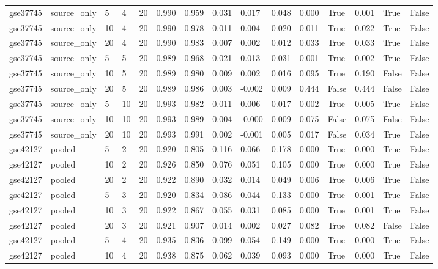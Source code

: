 \begin{table}[t]
\begin{tabular}{lllllllllllllll}
    gse37745 & source\_only & 5 & 4 & 20 & 0.990 & 0.959 & 0.031 & 0.017 & 0.048 & 0.000 & True & 0.001 & True & False \\
    gse37745 & source\_only & 10 & 4 & 20 & 0.990 & 0.978 & 0.011 & 0.004 & 0.020 & 0.011 & True & 0.022 & True & False \\
    gse37745 & source\_only & 20 & 4 & 20 & 0.990 & 0.983 & 0.007 & 0.002 & 0.012 & 0.033 & True & 0.033 & True & False \\
    gse37745 & source\_only & 5 & 5 & 20 & 0.989 & 0.968 & 0.021 & 0.013 & 0.031 & 0.001 & True & 0.002 & True & False \\
    gse37745 & source\_only & 10 & 5 & 20 & 0.989 & 0.980 & 0.009 & 0.002 & 0.016 & 0.095 & True & 0.190 & False & False \\
    gse37745 & source\_only & 20 & 5 & 20 & 0.989 & 0.986 & 0.003 & -0.002 & 0.009 & 0.444 & False & 0.444 & False & False \\
    gse37745 & source\_only & 5 & 10 & 20 & 0.993 & 0.982 & 0.011 & 0.006 & 0.017 & 0.002 & True & 0.005 & True & False \\
    gse37745 & source\_only & 10 & 10 & 20 & 0.993 & 0.989 & 0.004 & -0.000 & 0.009 & 0.075 & False & 0.075 & False & False \\
    gse37745 & source\_only & 20 & 10 & 20 & 0.993 & 0.991 & 0.002 & -0.001 & 0.005 & 0.017 & False & 0.034 & True & False \\
    gse42127 & pooled & 5 & 2 & 20 & 0.920 & 0.805 & 0.116 & 0.066 & 0.178 & 0.000 & True & 0.000 & True & False \\
    gse42127 & pooled & 10 & 2 & 20 & 0.926 & 0.850 & 0.076 & 0.051 & 0.105 & 0.000 & True & 0.000 & True & False \\
    gse42127 & pooled & 20 & 2 & 20 & 0.922 & 0.890 & 0.032 & 0.014 & 0.049 & 0.006 & True & 0.006 & True & False \\
    gse42127 & pooled & 5 & 3 & 20 & 0.920 & 0.834 & 0.086 & 0.044 & 0.133 & 0.000 & True & 0.001 & True & False \\
    gse42127 & pooled & 10 & 3 & 20 & 0.922 & 0.867 & 0.055 & 0.031 & 0.085 & 0.000 & True & 0.001 & True & False \\
    gse42127 & pooled & 20 & 3 & 20 & 0.921 & 0.907 & 0.014 & 0.002 & 0.027 & 0.082 & True & 0.082 & False & False \\
    gse42127 & pooled & 5 & 4 & 20 & 0.935 & 0.836 & 0.099 & 0.054 & 0.149 & 0.000 & True & 0.000 & True & False \\
    gse42127 & pooled & 10 & 4 & 20 & 0.938 & 0.875 & 0.062 & 0.039 & 0.093 & 0.000 & True & 0.000 & True & False \\

\end{tabular}
\end{table}
